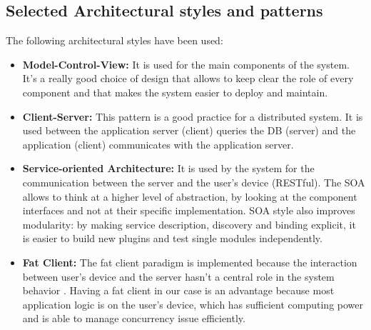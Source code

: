 \subsection{Selected Architectural styles and patterns}
The following architectural styles have been used:
\begin{itemize}
\item
\textbf{Model-Control-View:} It is used for the main components of the system. It’s a really good choice of design that allows to keep clear the role of every component and that makes the system easier to deploy and maintain.
\item
\textbf{Client-Server:} This pattern is a good practice for a distributed system. It is used between the application server (client) queries the DB (server) and the application (client) communicates with the application server.
\item
\textbf{Service-oriented Architecture:} It is used by the system for the communication between the server and the user’s device (RESTful). The SOA allows to think at a higher level of abstraction, by looking at the component interfaces and not at their specific implementation. SOA style also improves modularity: by making service description, discovery and binding explicit, it is easier to build new plugins and test single modules independently.
\item
\textbf{Fat Client:} The fat client paradigm is implemented because the interaction between user’s device and the server hasn’t a central role in the system behavior . Having a fat client in our case is an advantage because most application logic is on the user’s device, which has sufficient computing power and is able to manage concurrency issue efficiently.
\end{itemize}
